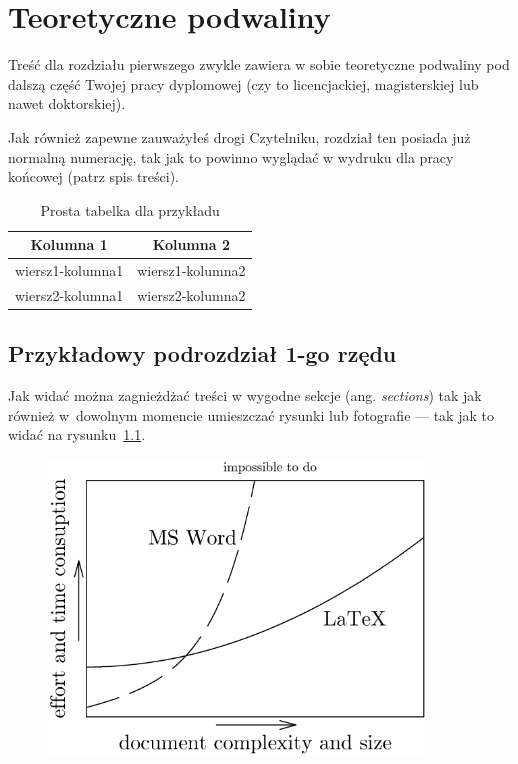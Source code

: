 \chapter{Teoretyczne podwaliny}
\label{chap:teoretyczne_podwaliny}

Treść dla rozdziału pierwszego zwykle zawiera w sobie teoretyczne podwaliny pod dalszą część Twojej pracy dyplomowej (czy to licencjackiej, magisterskiej lub nawet doktorskiej).

Jak również zapewne zauważyłeś drogi Czytelniku, rozdział ten posiada już normalną numerację, tak jak to powinno wyglądać w wydruku dla pracy końcowej (patrz spis treści).

\begin{table}[!h]
    \centering
    \begin{tabular}{|c|c|}
    \hline
    \textbf{Kolumna 1} & \textbf{Kolumna 2} \\ \hline \hline
    wiersz1-kolumna1 & wiersz1-kolumna2 \\ \hline
    wiersz2-kolumna1 & wiersz2-kolumna2 \\ \hline
    \end{tabular}
\caption{Prosta tabelka dla przykładu}
\label{tab:tab:prosta-tabela-przyklad-A}
\end{table}


\section{Przykładowy podrozdział 1-go rzędu}
Jak widać można zagnieżdżać treści w wygodne sekcje (ang. \textit{sections}) tak jak również w~dowolnym momencie umieszczać rysunki lub fotografie --- tak jak to widać na rysunku~\ref{fig:word-vs-latex}.

\begin{figure}[!ht]
\centering
\includegraphics[width=100mm]{images/word-vs-latex.png}
\label{fig:word-vs-latex}
\end{figure}

